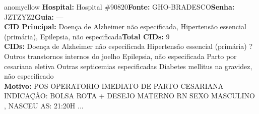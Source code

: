 \documentclass[a4paper,10pt]{article}
\begin{document}
\begin{anomalycard}[Interna\c{c}\~{a}o \#119636 | Pac. \#99212 | MODERADO (z=2.91) | LOS: 6d | 27/02/2026\,$\to$\,05/03/2026]{anomyellow}
\textbf{Hospital:} Hospital \#90820\quad \textbf{Fonte:} GHO-BRADESCO\quad \textbf{Senha:} JZTZYZ2\quad \textbf{Guia:} ---\\

\textbf{CID Principal:} {\small Doença de Alzheimer não especificada, Hipertensão essencial (primária), Epilepsia, não especificada}\quad\textbf{Total CIDs:} 9\\

\textbf{CIDs:} {\scriptsize Doença de Alzheimer não especificada \textbar{} Hipertensão essencial (primária) \textbar{} ? \textbar{} Outros transtornos internos do joelho \textbar{} Epilepsia, não especificada \textbar{} Parto por cesariana eletiva \textbar{} Outras septicemias especificadas \textbar{} Diabetes mellitus na gravidez, não especificado}\\

\textbf{Motivo:} {\scriptsize POS OPERATORIO IMEDIATO DE  PARTO CESARIANA   INDICAÇÃO: BOLSA ROTA + DESEJO MATERNO   RN SEXO MASCULINO , NASCEU AS:  21:20H ...}\\




\end{anomalycard}
\end{document}
